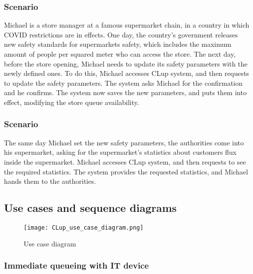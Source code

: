 \documentclass[../../main.tex]{subfiles}
\begin{document}
      \subsubsection{Scenario }

        Michael is a store manager at a famous supermarket chain, in a country in which COVID 
        restrictions are in effects.
        One day, the country's government releases new safety standards for supermarkets safety, which 
        includes the maximum amount of people per squared meter who can access the store. 
        The next day, before the store opening, Michael needs to update its safety parameters with the 
        newly defined ones. 
        To do this, Michael accesses CLup system, and then requests to update the safety parameters. 
        The system asks Michael for the confirmation and he confirms. 
        The system now saves the new parameters, and puts them into effect, modifying the store queue 
        availability.



      \subsubsection{Scenario }

        The same day Michael set the new safety parameters, the authorities come into his supermarket, 
        asking for the supermarket's statistics about customers flux inside the supermarket. 
        Michael accesses CLup system, and then requests to see the required statistics. 
        The system provides the requested statistics, and Michael hands them to the authorities. 



    \subsection{Use cases and sequence diagrams}

      \begin{figure}[H]
        \centering
        \texttt{[image: CLup\_use\_case\_diagram.png]}
        \caption{Use case diagram}
      \end{figure}

      \subsubsection{Immediate queueing with IT device}
\end{document}
